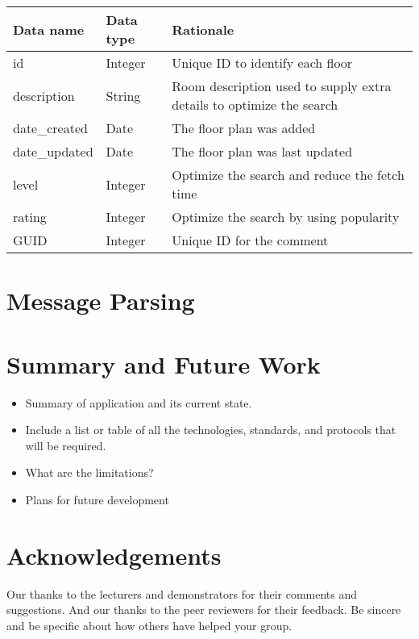 \documentclass{sig-alt-release2}
\begin{document}
\begin{tabular}{| p{2cm} | p{2cm} | p{3cm}|}
\hline
Data name & Data type & Rationale \\
\hline
id & Integer & Unique ID to identify each floor \\
\hline
description & String & Room description used to supply extra details to optimize the search\\
\hline
date\_created & Date & The floor plan was added\\
\hline
date\_updated & Date & The floor plan was last updated\\
\hline
level & Integer & Optimize the search and reduce the fetch time\\
\hline
rating & Integer & Optimize the search by using popularity\\
\hline
GUID & Integer & Unique ID for the comment\\
\hline
\end{tabular}	


\section{Message Parsing}


\section{Summary and Future Work}
\begin{itemize}
\item	Summary of application and its current state.
\item	Include a list or table of all the technologies, standards, and protocols that will be required.
\item	What are the limitations?
\item Plans for future development
\end{itemize}

\section{Acknowledgements}
Our thanks to the lecturers and demonstrators for their comments and suggestions. And our thanks to the peer reviewers for their feedback.
Be sincere and be specific about how others have helped your group.



\end{document}
